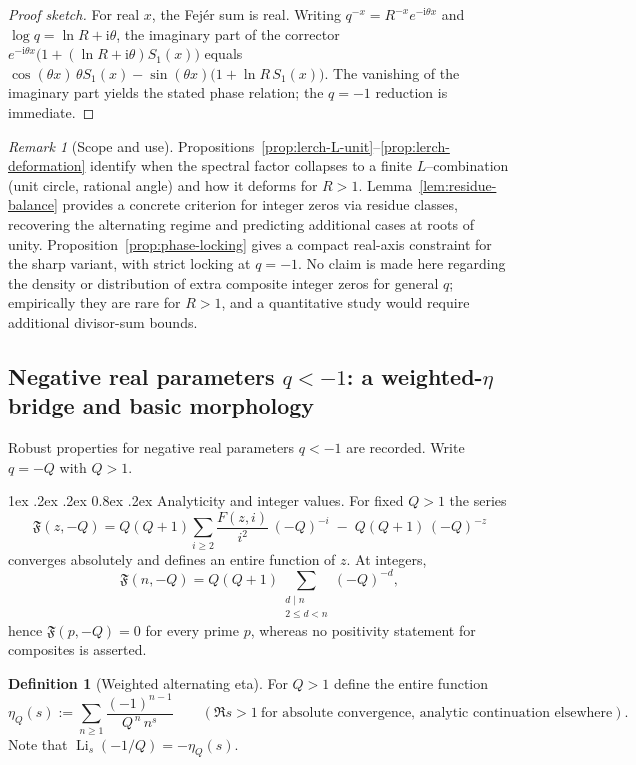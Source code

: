 \documentclass[11pt,a4paper]{amsart}
\makeatletter
\renewcommand\paragraph{\@startsection{paragraph}{4}{\z@}%
  {1ex \@plus .2ex \@minus .2ex}%
  {0.8ex \@plus .2ex}%
  {\normalfont\bfseries}}
\theoremstyle{plain}
\theoremstyle{definition}
\newtheorem{definition}[theorem]{Definition}
\theoremstyle{remark}
\newtheorem{remark}[theorem]{Remark}
\makeatother
\begin{document}
\begin{proof}[Proof sketch]
For real $x$, the Fej\'er sum is real. Writing $q^{-x}=R^{-x}e^{-\mathrm{i}\theta x}$ and
$\log q=\ln R+\mathrm{i}\theta$, the imaginary part of the corrector
$e^{-\mathrm{i}\theta x}\bigl(1+(\ln R+\mathrm{i}\theta)S_1(x)\bigr)$ equals
$\cos(\theta x)\,\theta S_1(x)-\sin(\theta x)\bigl(1+\ln R\,S_1(x)\bigr)$.
The vanishing of the imaginary part yields the stated phase relation; the $q=-1$ reduction is immediate.
\end{proof}

\begin{remark}[Scope and use]
Propositions~\ref{prop:lerch-L-unit}--\ref{prop:lerch-deformation} identify when the spectral factor
collapses to a finite $L$--combination (unit circle, rational angle) and how it deforms for $R>1$.
Lemma~\ref{lem:residue-balance} provides a concrete criterion for integer zeros via residue classes,
recovering the alternating regime and predicting additional cases at roots of unity.
Proposition~\ref{prop:phase-locking} gives a compact real-axis constraint for the sharp variant,
with strict locking at $q=-1$.
No claim is made here regarding the density or distribution of extra composite integer zeros for general $q$;
empirically they are rare for $R>1$, and a quantitative study would require additional divisor-sum bounds.
\end{remark}

\subsection{Negative real parameters \texorpdfstring{$q<-1$}{q<-1}: a weighted-\texorpdfstring{$\eta$}{eta} bridge and basic morphology}
\label{sec:qlessminus1}
Robust properties for negative real parameters $q<-1$ are recorded. Write $q=-Q$ with $Q>1$.

\paragraph{Analyticity and integer values.}
For fixed $Q>1$ the series
\[
\mathfrak F(z,-Q)=Q(Q+1)\sum_{i\ge2}\frac{F(z,i)}{i^2}\,(-Q)^{-i}\;-\;Q(Q+1)\,(-Q)^{-z}
\]
converges absolutely and defines an entire function of $z$. At integers,
\[
\mathfrak F(n,-Q)=Q(Q+1)\sum_{\substack{d\mid n\\2\le d<n}}(-Q)^{-d},
\]
hence $\mathfrak F(p,-Q)=0$ for every prime $p$, whereas no positivity statement for composites is asserted.

\begin{definition}[Weighted alternating eta]
For $Q>1$ define the entire function
\[
\eta_{Q}(s):=\sum_{n\ge1}\frac{(-1)^{n-1}}{Q^{\,n}\,n^{s}}\qquad(\Re s>1\ \text{for absolute convergence, analytic continuation elsewhere}).
\]
Note that $\operatorname{Li}_s(-1/Q)=-\eta_Q(s)$.
\end{definition}
\end{document}
